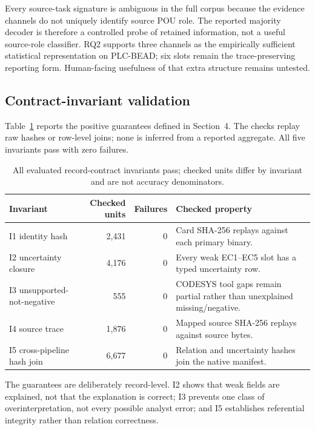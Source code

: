 \documentclass[manuscript,screen,review]{acmart}
\begin{document}
Every source-task signature is ambiguous in the full corpus because the evidence channels do not uniquely identify source POU role. The reported majority decoder is therefore a controlled probe of retained information, not a useful source-role classifier. RQ2 supports three channels as the empirically sufficient statistical representation on PLC-BEAD; six slots remain the trace-preserving reporting form. Human-facing usefulness of that extra structure remains untested.

\subsection{Contract-invariant validation}

Table~\ref{tab:invariants} reports the positive guarantees defined in Section~4. The checks replay raw hashes or row-level joins; none is inferred from a reported aggregate. All five invariants pass with zero failures.

\begin{table}[t]
\centering
\small
\caption{All evaluated record-contract invariants pass; checked units differ by invariant and are not accuracy denominators.}
\label{tab:invariants}
\begin{tabularx}{\textwidth}{>{\raggedright\arraybackslash}p{}r r>{\raggedright\arraybackslash}X}
\toprule
Invariant & Checked units & Failures & Checked property \\
\midrule
I1 identity hash & 2,431 & 0 & Card SHA-256 replays against each primary binary. \\
I2 uncertainty closure & 4,176 & 0 & Every weak EC1--EC5 slot has a typed uncertainty row. \\
I3 unsupported-not-negative & 555 & 0 & CODESYS tool gaps remain partial rather than unexplained missing/negative. \\
I4 source trace & 1,876 & 0 & Mapped source SHA-256 replays against source bytes. \\
I5 cross-pipeline hash join & 6,677 & 0 & Relation and uncertainty hashes join the native manifest. \\
\bottomrule
\end{tabularx}
\end{table}

The guarantees are deliberately record-level. I2 shows that weak fields are explained, not that the explanation is correct; I3 prevents one class of overinterpretation, not every possible analyst error; and I5 establishes referential integrity rather than relation correctness.
\end{document}
